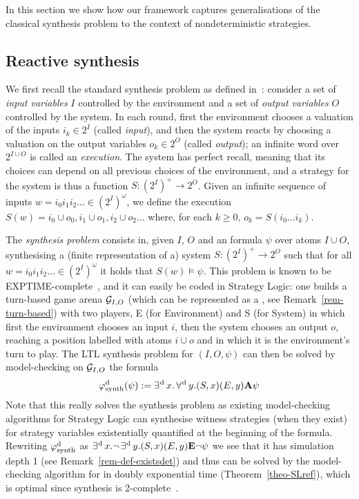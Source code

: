 In this section we show how our framework captures generalisations of
the classical \LTL synthesis problem to the context of nondeterministic strategies.

\subsection{Reactive synthesis}
\label{sec-ltl-synth}

We first recall the standard \LTL synthesis problem as defined
in~\cite{pnueli1989synthesisshort}: consider a set of \emph{input
  variables} $I$ controlled by the environment and a set of
\emph{output variables} $O$ controlled by the system. In each round,
first the environment chooses a valuation of the inputs $i_k\in 2^I$
(called \emph{input}), and then the system reacts by choosing a
valuation on the output variables $o_k\in 2^O$ (called \emph{output});
an infinite word over $2^{I\cup O}$ is called an
\emph{execution}. The system has perfect recall, meaning that its
choices can depend on all previous choices of the environment, and a
strategy for the system is thus a function $S:(2^I)^+\to 2^O$. Given
an infinite sequence of inputs $w=i_0i_1i_2\ldots \in (2^I)^\omega$, we
define the execution $S(w)=i_0\cup o_0, i_1\cup o_1, i_2\cup o_2\ldots$ where,
for each $k\geq 0$, $o_k=S(i_0\ldots i_k)$.

The \emph{\LTL synthesis problem} consists in,
given $I$, $O$ and an \LTL formula $\psi$ over atoms $I\cup O$,
synthesising a (finite representation of a) system $S:(2^I)^+\to 2^O$ such
that for all $w=i_0i_1i_2\ldots\in (2^I)^\omega$ it holds that $S(w)\models\psi$.
This problem is known to be
\2EXPTIME-complete~\cite{pnueli1989synthesisshort}, and it can easily
be coded in Strategy Logic: one builds a turn-based game arena $\CGS_{I,O}$ (which
can be represented as a \CGS, see Remark~\ref{rem-turn-based}) with
two players, E (for Environment) and S (for System) in
which first the environment chooses an input $i$, then the system chooses
an output $o$, reaching a position labelled with atoms $i\cup o$ and in which it is
the environment's turn to play. The LTL synthesis problem for $(I,O,\psi)$ can
then be solved by model-checking on $\CGS_{I,O}$ the \SLref formula
\[\varphi^{\text{d}}_{\text{synth}}(\psi):=\operatorname*{\exists^{\hskip.5pt\text{d}}} x.   \operatorname*{\forall^{\hskip.5pt\text{d}}} y.
 (S,x)(E,y) {\bf A} \psi\]
 Note that this really solves the synthesis
problem as existing model-checking algorithms for Strategy Logic can
synthesise  witness strategies (when they exist) for strategy variables existentially
quantified at the beginning of the formula.
Rewriting $\varphi^{\text{d}}_{\text{synth}}$ as $\operatorname*{\exists^{\hskip.5pt\text{d}}} x. \neg  \operatorname*{\exists^{\hskip.5pt\text{d}}}  y.
 (S,x)(E,y) {\bf E} \neg \psi$
we see that it has simulation depth 1 (see
Remark~\ref{rem-def-existsdet}) and thus can be solved by the
model-checking algorithm for \SLref in doubly
exponential time (Theorem~\ref{theo-SLref}), which is optimal since
\LTL synthesis is 2\EXPTIME-complete~\cite{pnueli1989synthesisshort}.

